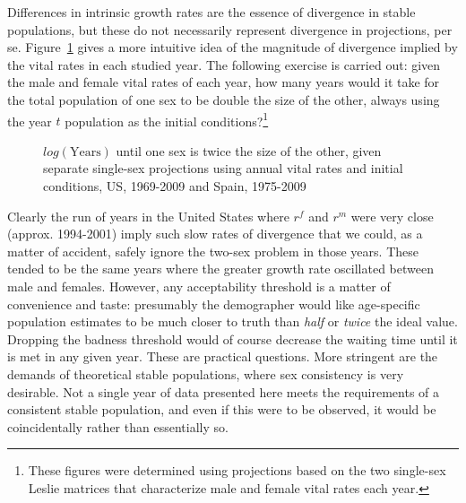  \FloatBarrier
\label{sec:ageSRdoubling}
Differences in intrinsic growth rates are the essence of divergence in
stable populations, but these do not necessarily represent divergence in
projections, per se. Figure~\ref{fig:rSRdoubling} gives a more intuitive idea of
the magnitude of divergence implied by the vital rates in each studied year. The following
 exercise is carried out: given the male and
female vital rates of each year, how many years would it take for the total
population of one sex to be double the size of the other, always using the year $t$ population as
the initial conditions?\footnote{These figures were determined using projections
based on the two single-sex Leslie matrices that characterize male and female
vital rates each year.}

\begin{figure}[ht!]
        \centering  
          \caption{$log(\mathrm{Years})$ until one sex is twice the size of the
          other, given separate single-sex projections using annual vital rates and initial
          conditions, US, 1969-2009 and Spain, 1975-2009}
           \quad
          \label{fig:rSRdoubling}
\end{figure}

Clearly the run of years in the United States where $r^f$ and $r^m$ were very
close (approx. 1994-2001) imply such slow rates of divergence that we could, as
a matter of accident, safely ignore the two-sex problem in those years. These
tended to be the same years where the greater growth rate oscillated between
male and females. However, any acceptability threshold is a matter of
convenience and taste: presumably the demographer would like age-specific 
population estimates to be much closer to truth than \textit{half} or \textit{twice} the ideal value.
Dropping the badness threshold would of course decrease the waiting time until
it is met in any given year. These are practical questions. More
stringent are the demands of theoretical stable populations, where
sex consistency is very desirable. Not a single year of data presented here
meets the requirements of a consistent stable population, and even if this were
to be observed, it would be coincidentally rather than essentially so. 
